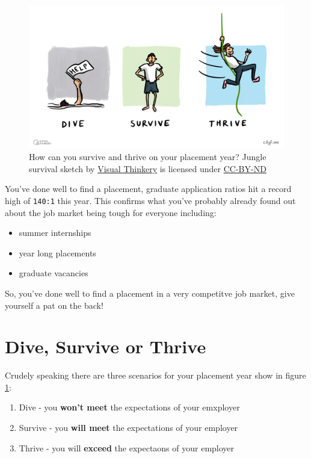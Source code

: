 \documentclass[
]{book}
\providecommand{\tightlist}{%
  \setlength{\itemsep}{0pt}\setlength{\parskip}{0pt}}
\begin{document}
\begin{figure}

{\centering \includegraphics[width=1\linewidth]{images/DiveThriveSurvive} 

}

\caption{How can you survive and thrive on your placement year? Jungle survival sketch by \href{https://visualthinkery.com}{Visual Thinkery} is licensed under \href{https://creativecommons.org/licenses/by-nd/4.0/}{CC-BY-ND}}\label{fig:survival-fig}
\end{figure}



You've done well to find a placement, graduate application ratios hit a record high of \texttt{140:1} this year. \citep{ratio} This confirms what you've probably already found out about the job market being tough for everyone including:

\begin{itemize}
\tightlist
\item
  summer internships
\item
  year long placements
\item
  graduate vacancies
\end{itemize}

So, you've done well to find a placement in a very competitve job market, give yourself a pat on the back!

\section{Dive, Survive or Thrive}\label{thrive}

Crudely speaking there are three scenarios for your placement year show in figure \ref{fig:survival-fig}:

\begin{enumerate}
\def\labelenumi{\arabic{enumi}.}
\tightlist
\item
  Dive - you \textbf{won't meet} the expectations of your emxployer
\item
  Survive - you \textbf{will meet} the expectations of your employer
\item
  Thrive - you will \textbf{exceed} the expectaons of your employer
\end{enumerate}
\end{document}
